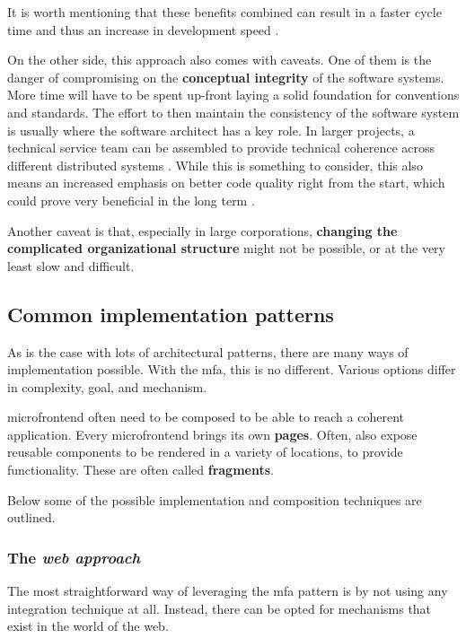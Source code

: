 It is worth mentioning that these benefits combined can result in a faster cycle
time and thus an increase in development speed \autocite{Geers_2020}.

On the other side, this approach also comes with caveats. One of them is the
danger of compromising on the \textbf{conceptual integrity} of the software
systems. More time will have to be spent up-front laying a solid foundation for
conventions and standards. The effort to then maintain the consistency of the
software system is usually where the software architect has a key role. In
larger projects, a technical service team can be assembled to provide technical
coherence across different distributed systems \autocite{Smite_etal_2010}. While
this is something to consider, this also means an increased emphasis on better
code quality right from the start, which could prove very beneficial in the long
term \autocite{LarmanVodde_2008}.

Another caveat is that, especially in large corporations, \textbf{changing the
complicated organizational structure} might not be possible, or at the very
least slow and difficult.

\subsection{Common implementation patterns}
\label{ssec:mf-implementation-patterns}

As is the case with lots of architectural patterns, there are many ways of
implementation possible. With the \gls{mfa}, this is no different. Various
options differ in complexity, goal, and mechanism. 

\Gls{microfrontend} often need to be composed to be able to reach a coherent
application. Every \Gls{microfrontend} brings its own \textbf{pages}. Often,
 also expose reusable components to be rendered in a
variety of locations, to provide functionality. These are often called
\textbf{fragments}.

Below some of the possible implementation and composition techniques are
outlined.

\subsubsection{The \textit{web approach}}

The most straightforward way of leveraging the \gls{mfa} pattern is by not using
any integration technique at all. Instead, there can be opted for mechanisms
that exist in the world of the web. 

